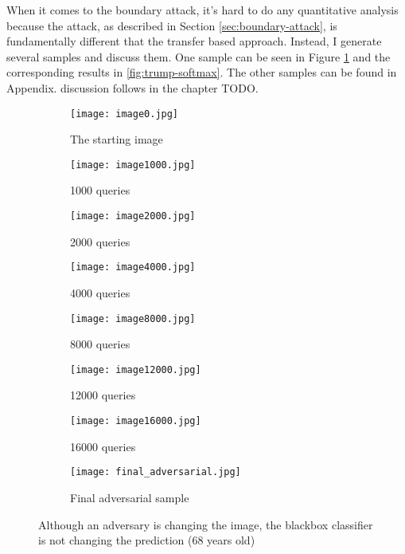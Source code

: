 When it comes to the boundary attack, it's hard to do any quantitative analysis because the attack, as described in Section \ref{sec:boundary-attack}, is fundamentally different that the transfer based approach. Instead, I generate several samples and discuss them. One sample can be seen in Figure \ref{fig:trump-adv} and the corresponding results in \ref{fig:trump-softmax}. The other samples can be found in Appendix. discussion follows in the chapter TODO.


\begin{figure}
\begin{subfigure}{.5\textwidth}
  \centering%
  \texttt{[image: image0.jpg]}
  \caption{The starting image}
\end{subfigure}
\begin{subfigure}{.5\textwidth}
  \centering
  \texttt{[image: image1000.jpg]}
  \caption{1000 queries}
\end{subfigure}

\begin{subfigure}{.5\textwidth}
  \centering
  \texttt{[image: image2000.jpg]}
  \caption{2000 queries}
\end{subfigure}
\begin{subfigure}{.5\textwidth}
  \centering
  \texttt{[image: image4000.jpg]}
  \caption{4000 queries}
\end{subfigure}

\begin{subfigure}{.5\textwidth}
  \centering
  \texttt{[image: image8000.jpg]}
  \caption{8000 queries}
\end{subfigure}
\begin{subfigure}{.5\textwidth}
  \centering
  \texttt{[image: image12000.jpg]}
  \caption{12000 queries}
\end{subfigure}

\begin{subfigure}{.5\textwidth}
  \centering
  \texttt{[image: image16000.jpg]}
  \caption{16000 queries}
\end{subfigure}
\begin{subfigure}{.5\textwidth}
  \centering
  \texttt{[image: final\_adversarial.jpg]}
  \caption{Final adversarial sample}
\end{subfigure}

\caption{Although an adversary is changing the image, the blackbox classifier is not changing the prediction (68 years old)}
\label{fig:trump-adv}
\end{figure}

